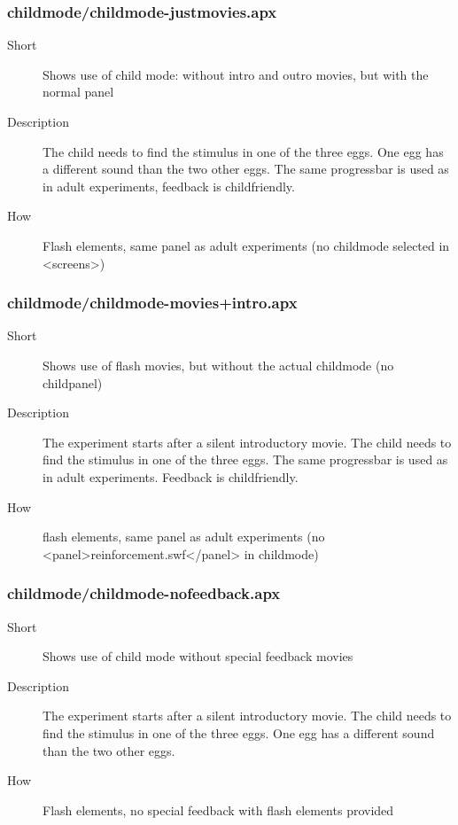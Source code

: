 \subsubsection{childmode/childmode-justmovies.apx}
\begin{description}
\item[Short] 
 Shows use of child mode: without intro and outro movies, but with the normal panel
\item[Description] 
 The child needs to find the stimulus in one of the three eggs. One egg has a different sound than the two other eggs. The same progressbar is used as in adult experiments, feedback is childfriendly.
\item[How] 
 Flash elements, same panel as adult experiments (no childmode selected in \textless{}screens\textgreater{})
\end{description}

\subsubsection{childmode/childmode-movies+intro.apx}
\begin{description}
\item[Short] 
 Shows use of flash movies, but without the actual childmode (no childpanel)
\item[Description] 
 The experiment starts after a silent introductory movie. The child needs to find the stimulus in one of the three eggs. The same progressbar is used as in adult experiments. Feedback is childfriendly.
\item[How] 
 flash elements, same panel as adult experiments (no \textless{}panel\textgreater{}reinforcement.swf\textless{}/panel\textgreater{} in childmode)
\end{description}

\subsubsection{childmode/childmode-nofeedback.apx}
\begin{description}
\item[Short] 
 Shows use of child mode without special feedback movies
\item[Description] 
 The experiment starts after a silent introductory movie. The child needs to find the stimulus in one of the three eggs. One egg has a different sound than the two other eggs.
\item[How] 
 Flash elements, no special feedback with flash elements provided
\end{description}

